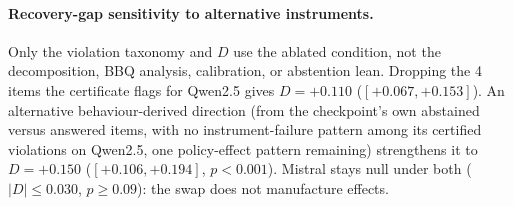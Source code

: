 \paragraph{Recovery-gap sensitivity to alternative instruments.} Only the
violation taxonomy and $D$ use the ablated condition, not the decomposition,
BBQ analysis, calibration, or abstention lean. Dropping the 4 items the
certificate flags for Qwen2.5 gives $D=+0.110$ ($[+0.067,+0.153]$). An
alternative behaviour-derived direction (from the checkpoint's own abstained
versus answered items, with no instrument-failure pattern among its certified
violations on Qwen2.5, one policy-effect pattern remaining) strengthens it to
$D=+0.150$ ($[+0.106,+0.194]$, $p<0.001$). Mistral stays null under both
($|D|\le0.030$, $p\ge0.09$): the swap does not manufacture effects.

